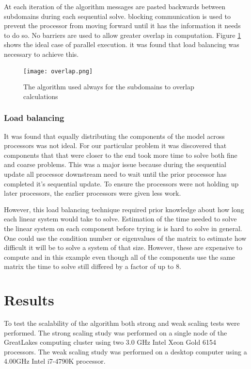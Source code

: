 \documentclass[conf]{new-aiaa}
\begin{document}
At each iteration of the algorithm messages are pasted backwards between subdomains during each sequential solve.
blocking communication is used to prevent the processor from moving forward until it has the information it needs to do so.
No barriers are used to allow greater overlap in computation.
Figure \ref{fig:overlap} shows the ideal case of parallel execution. it was found that load balancing was necessary to achieve this.


\begin{figure}[H]
	\centering
	\texttt{[image: overlap.png]}
	\caption{The algorithm used always for the subdomains to overlap calculations}
	\label{fig:overlap}
\end{figure}



\subsubsection{Load balancing}
It was found that equally distributing the components of the model across processors was not ideal.
For our particular problem it was discovered that components that that were closer to the end took more time to solve both fine and coarse problems.
This was a major issue because during the sequential update all processor downstream need to wait until the prior processor has completed it's sequential update.
To ensure the processors were not holding up later processors, the earlier processors were given less work.


However, this load balancing technique required prior knowledge about how long each linear system would take to solve.
Estimation of the time needed to solve the linear system on each component before trying is is hard to solve in general.
One could use the condition number or eigenvalues of the matrix to estimate how difficult it will be to solve a system of that size.
However, these are expensive to compute and in this example even though all of the components use the same matrix the time to solve still differed by a factor of up to 8.

\section{Results}

To test the scalability of the algorithm both strong and weak scaling tests were performed.
The strong scaling study was performed on a single node of the GreatLakes computing cluster using two 3.0 GHz Intel Xeon Gold 6154 processors.
The weak scaling study was performed on a desktop computer using a 4.00GHz Intel i7-4790K processor.
\end{document}
